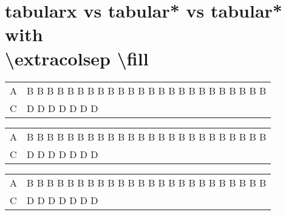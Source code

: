 \documentclass{article}
\begin{document}
\section{tabularx vs tabular* vs tabular* with \\ \textbackslash extracolsep \textbackslash fill}
\begin{center}
\begin{tabularx}{\textwidth}{|l|X|}
    \hline
    A & B B B B B B B B B B B B B B B B B B B B B B B B \\
    C & D D D D D D D                                   \\
    \hline
\end{tabularx}

\begin{tabular*}{\textwidth}{|l|l|}
    \hline
    A & B B B B B B B B B B B B B B B B B B B B B B B B \\
    C & D D D D D D D                                   \\
    \hline
\end{tabular*}

\begin{tabular*}{\textwidth}{@{\extracolsep{\fill}}|l|l|}
    \hline
    A & B B B B B B B B B B B B B B B B B B B B B B B B \\
    C & D D D D D D D                                   \\
    \hline
\end{tabular*}
\end{center}
\end{document}
